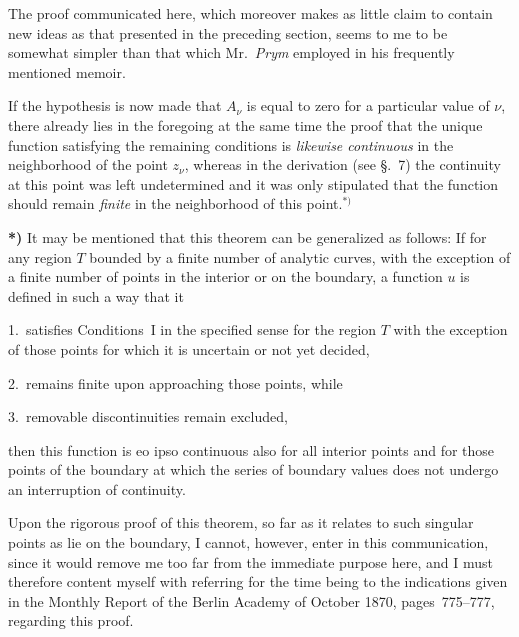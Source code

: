 \documentclass{article}
\begin{document}
The proof communicated here, which moreover makes as little claim to contain new ideas as that presented in the preceding section, seems to me to be somewhat simpler than that which Mr.~\emph{Prym} employed in his frequently mentioned memoir.



If the hypothesis is now made that $A_\nu$ is equal to zero for a particular value of $\nu$, there already lies in the foregoing at the same time the proof that the unique function satisfying the remaining conditions is \emph{likewise continuous} in the neighborhood of the point $z_\nu$, whereas in the derivation (see §.~7) the continuity at this point was left undetermined and it was only stipulated that the function should remain \emph{finite} in the neighborhood of this point.${}^{*)}$







\textbf{*)} It may be mentioned that this theorem can be generalized as follows: If for any region $T$ bounded by a finite number of analytic curves, with the exception of a finite number of points in the interior or on the boundary, a function $u$ is defined in such a way that it

1.~satisfies Conditions~I in the specified sense for the region $T$ with the exception of those points for which it is uncertain or not yet decided,

2.~remains finite upon approaching those points, while

3.~removable discontinuities remain excluded,

then this function is eo ipso continuous also for all interior points and for those points of the boundary at which the series of boundary values does not undergo an interruption of continuity.







Upon the rigorous proof of this theorem, so far as it relates to such singular points as lie on the boundary, I cannot, however, enter in this communication, since it would remove me too far from the immediate purpose here, and I must therefore content myself with referring for the time being to the indications given in the Monthly Report of the Berlin Academy of October 1870, pages~775--777, regarding this proof.



\end{document}
